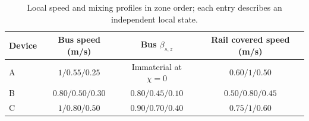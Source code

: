 \begin{table}[H]
\centering\fontsize{9.5}{10.7}\selectfont
\caption{Local speed and mixing profiles in zone order; each entry describes an independent local state.}
\label{tab:bus-fields}
\begin{tabular}{@{}lccc@{}}
\toprule
Device & Bus speed (m/s) & Bus $\beta_{s,z}$ & Rail covered speed (m/s)\\
\midrule
A & $1/0.55/0.25$ & Immaterial at $\chi=0$ & $0.60/1/0.50$\\
B & $0.80/0.50/0.30$ & $0.80/0.45/0.10$ & $0.50/0.80/0.45$\\
C & $1/0.80/0.50$ & $0.90/0.70/0.40$ & $0.75/1/0.60$\\
\bottomrule
\end{tabular}
\end{table}

\endgroup
